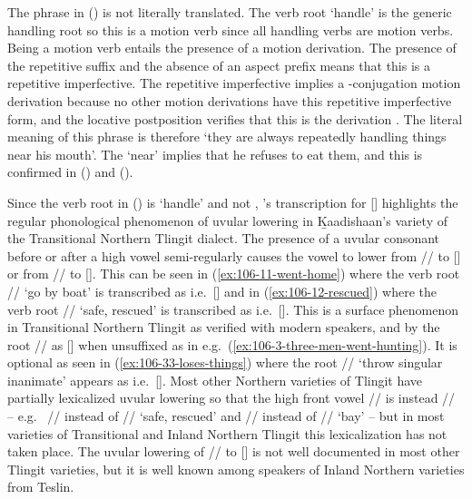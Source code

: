 The phrase  in (\lastx) is not literally translated.
The verb root  ‘handle’ is the generic handling root so this is a motion verb since all handling verbs are motion verbs.
Being a motion verb entails the presence of a motion derivation.
The presence of the  repetitive suffix and the absence of an aspect prefix means that this is a repetitive imperfective.
The  repetitive imperfective implies a -conjugation motion derivation because no other motion derivations have this repetitive imperfective form, and the  locative postposition verifies that this is the derivation .
The literal meaning of this phrase is therefore ‘they are always repeatedly handling things near his mouth’.
The ‘near’ implies that he refuses to eat them, and this is confirmed in (\nextx) and (\anextx).

Since the verb root in (\lastx) is  ‘handle’ and not , \citeauthor{swanton:1909}’s transcription  for  [] highlights the regular phonological phenomenon of uvular lowering in Ḵaadishaan’s variety of the Transitional Northern Tlingit dialect.
The presence of a uvular consonant before or after a high vowel semi-regularly causes the vowel to lower from // to [] or from // to [].
This can be seen in (\ref{ex:106-11-went-home}) where the verb root  // ‘go by boat’ is transcribed as  i.e.\ [] and in (\ref{ex:106-12-rescued}) where the verb root  // ‘safe, rescued’ is transcribed as  i.e.\ [].
This is a surface phenomenon in Transitional Northern Tlingit as verified with modern speakers, and by the root  // as [] when unsuffixed as in e.g.\ (\ref{ex:106-3-three-men-went-hunting}).
It is optional as seen in (\ref{ex:106-33-loses-things}) where the root  // ‘throw singular inanimate’ appears as  i.e.\ [].
Most other Northern varieties of Tlingit have partially lexicalized uvular lowering so that the high front vowel // is instead // – e.g.\  // instead of  // ‘safe, rescued’ and  // instead of  // ‘bay’ – but in most varieties of Transitional and Inland Northern Tlingit this lexicalization has not taken place.
The uvular lowering of // to [] is not well documented in most other Tlingit varieties, but it is well known among speakers of Inland Northern varieties from Teslin.

